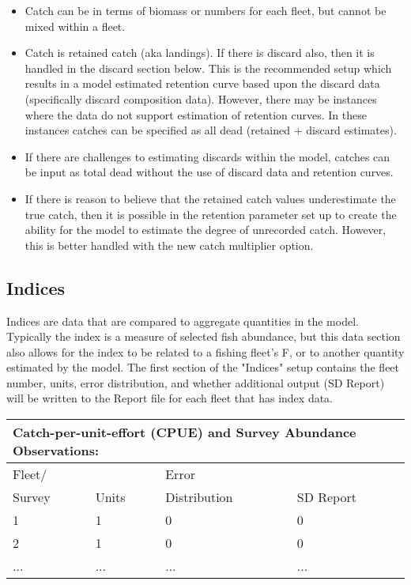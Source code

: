 \begin{itemize}
	\item Catch can be in terms of biomass or numbers for each fleet, but cannot be mixed within a fleet.
	\item Catch is retained catch (aka landings). If there is discard also, then it is handled in the discard section below.  This is the recommended setup which results in a model estimated retention curve based upon the discard data (specifically discard composition data).  However, there may be instances where the data do not support estimation of retention curves.  In these instances catches can be specified as all dead (retained + discard estimates).
	\item If there are challenges to estimating discards within the model, catches can be input as total dead without the use of discard data and retention curves.
	\item If there is reason to believe that the retained catch values underestimate the true catch, then it is possible in the retention parameter set up to create the ability for the model to estimate the degree of unrecorded catch.  However, this is better handled with the new catch multiplier option.
\end{itemize}


\subsection{Indices}
Indices are data that are compared to aggregate quantities in the model.  Typically the index is a measure of selected fish abundance, but this data section also allows for the index to be related to a fishing fleet's F, or to another quantity estimated by the model.  The first section of the "Indices" setup contains the fleet number, units, error distribution, and whether additional output (SD Report) will be written to the Report file for each fleet that has index data.

\begin{center}
	\begin{tabular}{p{3cm} p{2cm} p{3cm} p{6cm}}
		\multicolumn{4}{l}{Catch-per-unit-effort (CPUE) and Survey Abundance Observations:}\\
		\hline
		Fleet/ &        & Error      &  \Tstrut\\
		Survey & Units  & Distribution & SD Report \Bstrut\\
		\hline
		1 & 1 & 0 & 0 \Tstrut\\
		2 & 1 & 0 & 0 \\
		... & ... & ... & ... \Bstrut\\
		\hline
	\end{tabular}		
\end{center}


